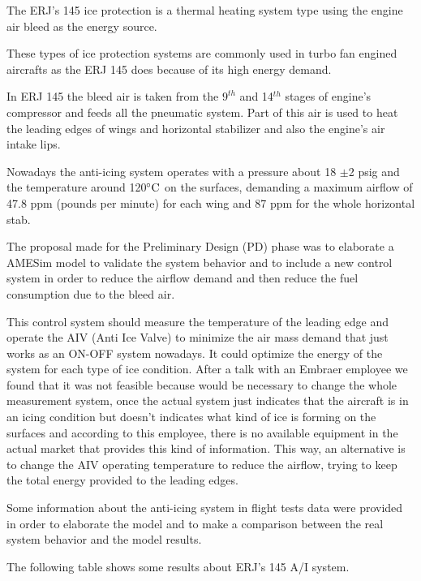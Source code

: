 The ERJ's 145 ice protection is a thermal heating system type using the engine air bleed as the energy source.

These types of ice protection systems are commonly used in turbo fan engined aircrafts as the ERJ 145 does because of its high energy demand.

In ERJ 145 the bleed air is taken from the $9^{th}$ and 14$^{th}$ stages of engine's compressor and feeds all the pneumatic system. Part of this air is used to heat the leading edges of wings and horizontal stabilizer and also the engine's air intake lips.

Nowadays the anti-icing system operates with a pressure about 18 $\pm$2 psig and the temperature around 120$\celsius$ on the surfaces, demanding a maximum airflow of 47.8 ppm (pounds per minute) for each wing and 87 ppm for the whole horizontal stab.

The proposal made for the Preliminary Design (PD) phase was to elaborate a AMESim model to validate the system behavior and to include a new control system in order to reduce the airflow demand and then reduce the fuel consumption due to the bleed air.

This control system should measure the temperature of the leading edge and operate the AIV (Anti Ice Valve) to minimize the air mass demand that just works as an ON-OFF system nowadays. It could optimize the energy of the system for each type of ice condition. After a talk with an Embraer employee we found that it was not feasible because would be necessary to change the whole measurement system, once the actual system just indicates that the aircraft is in an icing condition but doesn't indicates what kind of ice is forming on the surfaces and according to this employee, there is no available equipment in the actual market that provides this kind of information. This way, an alternative is to change the AIV operating temperature to reduce the airflow, trying to keep the total energy provided to the leading edges.

Some information about the anti-icing system in flight tests data were provided in order to elaborate the model and to make a comparison between the real system behavior and the model results.

The following table shows some results about ERJ's 145 A/I system.

